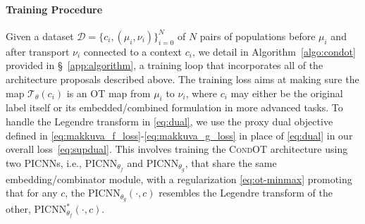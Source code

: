 \paragraph{Training Procedure}
 Given a dataset $\mathcal{D}=\{c_i, (\mu_i, \nu_i) \}_{i=0}^N$ of $N$ pairs of populations before $\mu_i$ and after transport $\nu_i$ connected to a context $c_i$, we detail in Algorithm~\ref{algo:condot} provided in \S~\ref{app:algorithm}, a training loop that incorporates all of the architecture proposals described above. The training loss aims at making sure the map $\mathcal{T}_\theta(c_i)$ is an OT map from $\mu_i$ to $\nu_i$, where $c_i$ may either be the original label itself or its embedded/combined formulation in more advanced tasks. To handle the Legendre transform in \eqref{eq:dual}, we use the proxy dual objective defined in \citep[Eq. 6]{makkuva2020optimal} \eqref{eq:makkuva_f_loss}-\eqref{eq:makkuva_g_loss} in place of \eqref{eq:dual} in our overall loss~\eqref{eq:supdual}.
This involves training the \textsc{CondOT} architecture using two PICNNs, i.e., $\text{PICNN}_{\theta_f}$ and $\text{PICNN}_{\theta_g}$, that share the same embedding/combinator module, with a regularization \eqref{eq:ot-minmax} promoting that for any $c$, the $\text{PICNN}_{\theta_g}(\cdot,c)$ resembles the Legendre transform of the other, $\text{PICNN}_{\theta_f}^*(\cdot,c)$.


